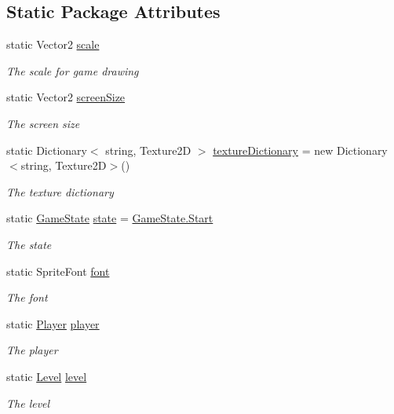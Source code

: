 \subsection*{Static Package Attributes}
\begin{DoxyCompactItemize}
\item 
static Vector2 \hyperlink{classXaria_1_1Game1_a898cce284fb6f0610dc80b644b2515e8}{scale}
\begin{DoxyCompactList}\small\item\em The scale for game drawing \end{DoxyCompactList}\item 
static Vector2 \hyperlink{classXaria_1_1Game1_a6ed6553ba5719c56420ea91daf45baac}{screen\+Size}
\begin{DoxyCompactList}\small\item\em The screen size \end{DoxyCompactList}\item 
static Dictionary$<$ string, Texture2D $>$ \hyperlink{classXaria_1_1Game1_a4b450443afb4c333b7c1e4f52beaebb8}{texture\+Dictionary} = new Dictionary$<$string, Texture2D$>$()
\begin{DoxyCompactList}\small\item\em The texture dictionary \end{DoxyCompactList}\item 
static \hyperlink{namespaceXaria_a2c2420c982c39ab01bdb72f1d7d4aac7}{Game\+State} \hyperlink{classXaria_1_1Game1_aba3abde5ccacf8d7e06d7eddf07a32ef}{state} = \hyperlink{namespaceXaria_a2c2420c982c39ab01bdb72f1d7d4aac7aa6122a65eaa676f700ae68d393054a37}{Game\+State.\+Start}
\begin{DoxyCompactList}\small\item\em The state \end{DoxyCompactList}\item 
static Sprite\+Font \hyperlink{classXaria_1_1Game1_a5693ebed547453aca51068c8f941c690}{font}
\begin{DoxyCompactList}\small\item\em The font \end{DoxyCompactList}\item 
static \hyperlink{classXaria_1_1Player}{Player} \hyperlink{classXaria_1_1Game1_a4bd930c3ac170ab2e202b58bb093eb81}{player}
\begin{DoxyCompactList}\small\item\em The player \end{DoxyCompactList}\item 
static \hyperlink{classXaria_1_1Level}{Level} \hyperlink{classXaria_1_1Game1_a0923aa0c8e68d0408afab30eb1817e5e}{level}
\begin{DoxyCompactList}\small\item\em The level \end{DoxyCompactList}\end{DoxyCompactItemize}
